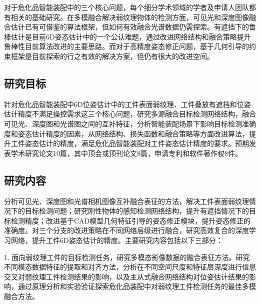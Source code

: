 \documentclass[12pt]{article}
\begin{document}
对于危化品智能装配中的三个核心问题，每个细分学术领域的学者及申请人团队都有相关的基础研究。在多模融合解决弱纹理物体的检测方面，可见光和深度图像融合估计已有可借鉴的算法框架，但如何有效融合光谱数据仍需探索。有遮挡下的鲁棒估计是目前6D姿态估计中的一个公认难题，通过改进网络结构和融合策略提升鲁棒性目前算法改进的主要思路。而对于高精度姿态修正问题，基于几何引导的约束框架是目前探索的行之有效的解决方案，但仍有很大的改进空间。
{


}



\subsection{研究目标}

针对危化品智能装配中6D位姿估计中的工件表面弱纹理、工件叠放有遮挡和位姿估计精度不满足操控需求这三个核心问题，研究多源融合目标检测网络结构，融合可见光、深度图和光谱图之间的互补特征，分析智能装配场景下影响目标检测准确度和姿态估计精度的因素，从网络结构、损失函数和融合策略等方面改进算法，提升工件姿态估计的精度，满足危化品智能装配对工件姿态估计精度的要求。预期发表学术研究论文10篇，其中顶会或顶刊论文8篇，申请专利和软件著作权8件。

\subsection{研究内容}

分析可见光、深度图和光谱相机图像互补融合表征的方法，解决工件表面弱纹理情况下的目标检测问题；研究刚性物体的感知检测网络结构，提升有遮挡情况下的目标检测精度；改进基于CAD模型几何特征引导的姿态修正模块，提升姿态修正的准确度。对三个分支的改进策略在不同网络层级进行融合，研究高效复合的深度学习网络，提升工件6D姿态估计的精度。主要研究内容包括以下三部分：

1. 面向弱纹理工件的目标检测任务，研究多模态影像数据的融合表征方法。研究不同模态数据特征的提取和对齐方法，分析在不同空间尺度和特征层深度进行信息交叉对弱纹理工件检测结果的影响，以及主从式融合网络结构对位姿估计结果的影响，通过原理分析和实验验证探索危化品装配中对弱纹理工件检测任务的最佳多模融合方法。
\end{document}
